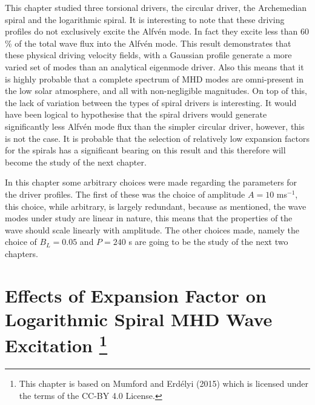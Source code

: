 \documentclass[a4paper,12pt,fourier,authoryear,custommargin]{Classes/PhDThesisPSnPDF}
\begin{document}
This chapter studied three torsional drivers, the circular driver, the Archemedian spiral and the logarithmic spiral.
It is interesting to note that these driving profiles do not exclusively excite the Alfv\'en mode.
In fact they excite less than $60$ \% of the total wave flux into the Alfv\'en mode.
This result demonstrates that these physical driving velocity fields, with a Gaussian profile generate a more varied set of modes than an analytical eigenmode driver.
Also this means that it is highly probable that a complete spectrum of MHD modes are omni-present in the low solar atmosphere, and all with non-negligible magnitudes.
On top of this, the lack of variation between the types of spiral drivers is interesting.
It would have been logical to hypothesise that the spiral drivers would generate significantly less Alfv\'en mode flux than the simpler circular driver, however, this is not the case.
It is probable that the selection of relatively low expansion factors for the spirals has a significant bearing on this result and this therefore will become the study of the next chapter.

In this chapter some arbitrary choices were made regarding the parameters for the driver profiles.
The first of these was the choice of amplitude $A=10$ ms$^{-1}$, this choice, while arbitrary, is largely redundant, because as mentioned, the wave modes under study are linear in nature, this means that the properties of the wave should scale linearly with amplitude.
The other choices made, namely the choice of $B_L = 0.05$ and $P=240$ s are going to be the study of the next two chapters.
\clearpage{}%
%

%
\clearpage{}%

\chapter[Effects of Expansion Factor on Logarithmic Spiral MHD Wave Excitation]{Effects of Expansion Factor on Logarithmic Spiral MHD Wave Excitation \footnote{This chapter is based on Mumford and Erd\'elyi (2015) which is licensed under the terms of the CC-BY 4.0 License.}}\label{ch:expfac}
\end{document}
